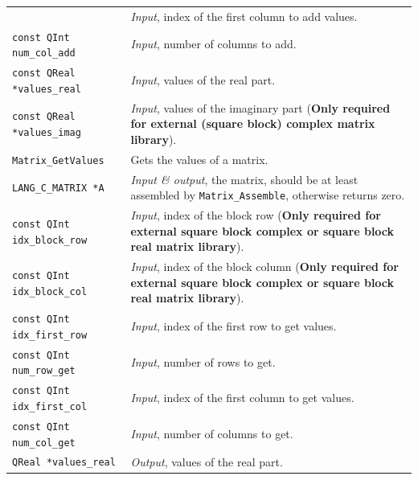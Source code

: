 \documentclass[a4paper,11pt,twoside,openright]{book}
\begin{document}
\begin{center}
\begin{longtable}{l|p{}}
      & \textsl{Input}, index of the first column to add values.\\
    \hspace*{2ex}\verb|const QInt num_col_add| %
      & \textsl{Input}, number of columns to add.\\
    \hspace*{2ex}\verb|const QReal *values_real| %
      & \textsl{Input}, values of the real part.\\
    \hspace*{2ex}\verb|const QReal *values_imag| %
      & \textsl{Input}, values of the imaginary part %
        (\textbf{Only required for external (square block) complex matrix library}).\\
    \hline
%
    \verb|Matrix_GetValues|\index{\texttt{Matrix\_GetValues}} %
      & Gets the values of a matrix.\\
    \hspace*{2ex}\verb|LANG_C_MATRIX *A| %
      & \textsl{Input \& output}, the matrix, should be at least assembled by
        \verb|Matrix_Assemble|, otherwise returns zero.\\
    \hspace*{2ex}\verb|const QInt idx_block_row| %
      & \textsl{Input}, index of the block row %
        (\textbf{Only required for external square block complex or
        square block real matrix library}).\\
    \hspace*{2ex}\verb|const QInt idx_block_col| %
      & \textsl{Input}, index of the block column%
        (\textbf{Only required for external square block complex or
        square block real matrix library}).\\
    \hspace*{2ex}\verb|const QInt idx_first_row| %
      & \textsl{Input}, index of the first row to get values.\\
    \hspace*{2ex}\verb|const QInt num_row_get| %
      & \textsl{Input}, number of rows to get.\\
    \hspace*{2ex}\verb|const QInt idx_first_col| %
      & \textsl{Input}, index of the first column to get values.\\
    \hspace*{2ex}\verb|const QInt num_col_get| %
      & \textsl{Input}, number of columns to get.\\
    \hspace*{2ex}\verb|QReal *values_real| %
      & \textsl{Output}, values of the real part.\\

\end{longtable}
\end{center}
\end{document}
